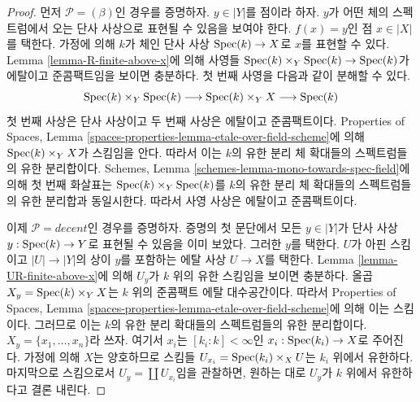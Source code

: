\begin{proof}
먼저 $\mathcal{P} = (\beta)$인 경우를 증명하자. $y \in |Y|$를
점이라 하자. $y$가 어떤 체의 스펙트럼에서 오는 단사 사상으로 표현될
수 있음을 보여야 한다. $f(x) = y$인 점 $x \in |X|$를 택한다.
가정에 의해 $k$가 체인 단사 사상 $\mathop{\mathrm{Spec}}(k) \to X$로 $x$를 표현할 수
있다. Lemma \ref{lemma-R-finite-above-x}에 의해 사영들
$\mathop{\mathrm{Spec}}(k) \times_Y \mathop{\mathrm{Spec}}(k) \to \mathop{\mathrm{Spec}}(k)$가 에탈이고 준콤팩트임을
보이면 충분하다. 첫 번째 사영을 다음과 같이 분해할 수 있다.
$$
\mathop{\mathrm{Spec}}(k) \times_Y \mathop{\mathrm{Spec}}(k)
\longrightarrow
\mathop{\mathrm{Spec}}(k) \times_Y X
\longrightarrow
\mathop{\mathrm{Spec}}(k)
$$
첫 번째 사상은 단사 사상이고 두 번째 사상은 에탈이고 준콤팩트이다.
Properties of Spaces, Lemma
\ref{spaces-properties-lemma-etale-over-field-scheme}에 의해
$\mathop{\mathrm{Spec}}(k) \times_Y X$가 스킴임을 안다. 따라서 이는 $k$의 유한
분리 체 확대들의 스펙트럼들의 유한 분리합이다. Schemes, Lemma
\ref{schemes-lemma-mono-towards-spec-field}에 의해 첫 번째 화살표는
$\mathop{\mathrm{Spec}}(k) \times_Y \mathop{\mathrm{Spec}}(k)$를 $k$의 유한 분리 체 확대들의
스펙트럼들의 유한 분리합과 동일시한다. 따라서 사영 사상은 에탈이고
준콤팩트이다.

\medskip\noindent
이제 $\mathcal{P} = decent$인 경우를 증명하자. 증명의 첫 문단에서
모든 $y \in |Y|$가 단사 사상 $y : \mathop{\mathrm{Spec}}(k) \to Y$로 표현될 수
있음을 이미 보았다. 그러한 $y$를 택한다. $U$가 아핀 스킴이고
$|U| \to |Y|$의 상이 $y$를 포함하는 에탈 사상 $U \to X$를 택한다.
Lemma \ref{lemma-UR-finite-above-x}에 의해 $U_y$가 $k$ 위의 유한
스킴임을 보이면 충분하다. 올곱 $X_y = \mathop{\mathrm{Spec}}(k) \times_Y X$는 $k$
위의 준콤팩트 에탈 대수공간이다. 따라서 Properties of Spaces, Lemma
\ref{spaces-properties-lemma-etale-over-field-scheme}에 의해 이는
스킴이다. 그러므로 이는 $k$의 유한 분리 확대들의 스펙트럼들의 유한
분리합이다. $X_y = \{x_1, \ldots, x_n\}$라 쓰자. 여기서 $x_i$는
$[k_i : k] < \infty$인 $x_i : \mathop{\mathrm{Spec}}(k_i) \to X$로 주어진다.
가정에 의해 $X$는 양호하므로 스킴들
$U_{x_i} = \mathop{\mathrm{Spec}}(k_i) \times_X U$는 $k_i$ 위에서 유한하다.
마지막으로 스킴으로서 $U_y = \coprod U_{x_i}$임을 관찰하면,
원하는 대로 $U_y$가 $k$ 위에서 유한하다고 결론 내린다.


\end{proof}
